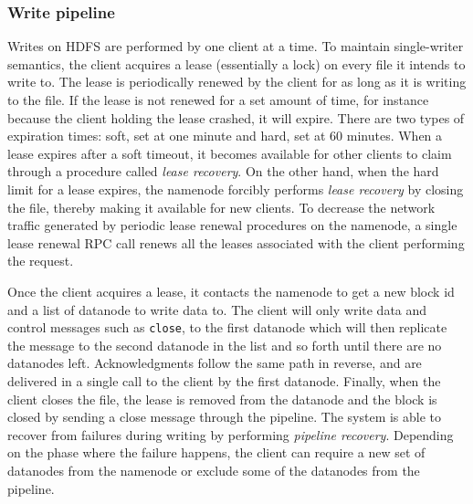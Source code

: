 \subsubsection{Write pipeline}
\label{sec:write-pipeline}
Writes on HDFS are performed by one client at a time.
To maintain single-writer semantics, the client acquires a lease (essentially a lock) on every file it intends to write to.
The lease is periodically renewed by the client for as long as it is writing to the file.
If the lease is not renewed for a set amount of time, for instance because the client holding the lease crashed, it will expire.
There are two types of expiration times: soft, set at one minute and hard, set at 60 minutes.
When a lease expires after a soft timeout, it becomes available for other clients to claim through a procedure called \textit{lease recovery}.
On the other hand, when the hard limit for a lease expires, the namenode forcibly performs \textit{lease recovery} by closing the file, thereby making it available for new clients.
To decrease the network traffic generated by periodic lease renewal procedures on the namenode, a single lease renewal RPC call renews all the leases associated with the client performing the request.

Once the client acquires a lease, it contacts the namenode to get a new block id and a list of datanode to write data to.
The client will only write data and control messages such as \texttt{close}, to the first datanode which will then replicate the message to the second datanode in the list and so forth until there are no datanodes left.
Acknowledgments follow the same path in reverse, and are delivered in a single call to the client by the first datanode.
Finally, when the client closes the file, the lease is removed from the datanode and the block is closed by sending a close message through the pipeline.
The system is able to recover from failures during writing by performing \textit{pipeline recovery}.
Depending on the phase where the failure happens, the client can require a new set of datanodes from the namenode or exclude some of the datanodes from the pipeline.

